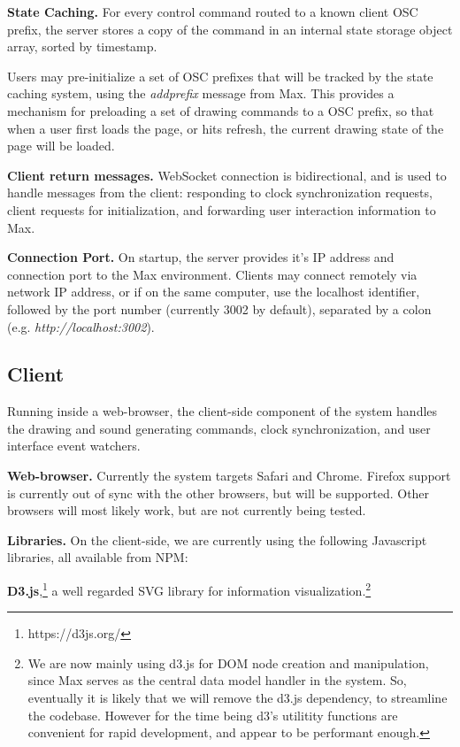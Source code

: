 \medskip
\noindent
\textbf{State Caching.}
For every control command routed to a known client OSC prefix, the server stores a copy of the command in an internal state storage object array, sorted by timestamp.

Users may pre-initialize a set of OSC prefixes that will be tracked by the state caching system, using the \textit{addprefix} message from Max.
This provides a mechanism for preloading a set of drawing commands to a OSC prefix, so that when a user first loads the page, or hits refresh, the current drawing state of the page will be loaded.

\medskip
\noindent
\textbf{Client return messages.}
WebSocket connection is bidirectional, and is used to handle messages from the client: responding to clock synchronization requests, client requests for initialization, and forwarding user interaction information to Max.

\medskip
\noindent
\textbf{Connection Port.} 
On startup, the server provides it's IP address and connection port to the Max environment.
Clients may connect remotely via network IP address, or if on the same computer, use the localhost identifier, followed by the port number (currently 3002 by default), separated by a colon (e.g. \textit{http://localhost:3002}).
 
 \subsection{Client}  
Running inside a web-browser, the client-side component of the \drawsocket system handles the drawing and sound generating commands, clock synchronization, and user interface event watchers.

\medskip
\noindent
\textbf{Web-browser.}  
Currently the system targets Safari and Chrome. 
Firefox support is currently out of sync with the other browsers, but will be supported. Other browsers will most likely work, but are not currently being tested.

\medskip
\noindent
\textbf{Libraries.}
On the client-side, we are currently using the following Javascript libraries, all available from NPM:

\textbf{D3.js},\footnote{https://d3js.org/} a well regarded SVG library for information visualization.\footnote{We are now mainly using d3.js for DOM node creation and manipulation, since Max serves as the central data model handler in the \drawsocket system. So, eventually it is likely that we will remove the d3.js dependency, to streamline the codebase. However for the time being d3's utilitity functions are convenient for rapid development, and appear to be performant enough.}

